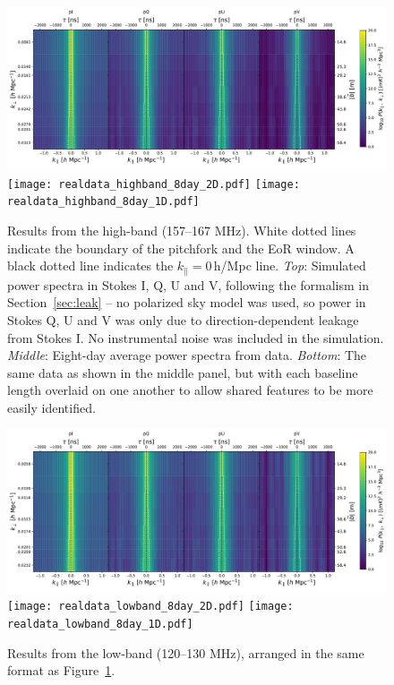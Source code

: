 \documentclass[twocolumn, trackchanges]{aastex61}
\begin{document}
\begin{figure}[h]
\centering
\includegraphics[scale=0.45]{simdata_highband_8day_2D.pdf}
\texttt{[image: realdata\_highband\_8day\_2D.pdf]}
\texttt{[image: realdata\_highband\_8day\_1D.pdf]}
\caption{Results from the high-band (157--167 MHz). White dotted lines indicate the boundary of the pitchfork and the EoR window. A black dotted line indicates the $k_{\parallel}=0$\,h/Mpc line. \textit{Top}: Simulated power spectra in Stokes I, Q, U and V, following the formalism in Section~\ref{sec:leak} -- no polarized sky model was used, so power in Stokes Q, U and V was only due to direction-dependent leakage from Stokes I. No instrumental noise was included in the simulation. \textit{Middle}: Eight-day average power spectra from data. \textit{Bottom}: The same data as shown in the middle panel, but with each baseline length overlaid on one another to allow shared features to be more easily identified.}
\label{fig:pitchforks_highband}
\end{figure}

\begin{figure}[h]
\centering
\includegraphics[scale=0.45]{simdata_lowband_8day_2D.pdf}
\texttt{[image: realdata\_lowband\_8day\_2D.pdf]}
\texttt{[image: realdata\_lowband\_8day\_1D.pdf]}
\caption{Results from the low-band (120--130 MHz), arranged in the same format as Figure~\ref{fig:pitchforks_highband}.}
\label{fig:pitchforks_lowband}
\end{figure}
\end{document}

